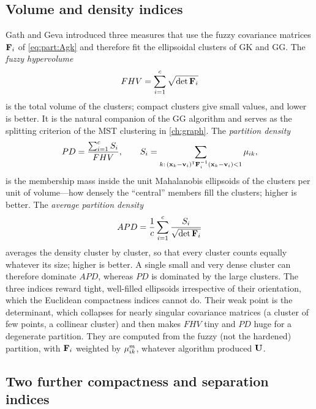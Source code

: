 \subsection{Volume and density indices}\label{sec:val:volume}

Gath and Geva \cite{gath:1989} introduced three measures that use the fuzzy covariance matrices $\mathbf{F}_i$ of \eqref{eq:part:Agk} and therefore fit the ellipsoidal clusters of GK and GG. The \emph{fuzzy hypervolume}
\begin{equation}
  FHV=\sum_{i=1}^{c}\sqrt{\det\mathbf{F}_i}
  \label{eq:val:fhv}
\end{equation}
is the total volume of the clusters; compact clusters give small values, and lower is better. It is the natural companion of the GG algorithm and serves as the splitting criterion of the MST clustering in \cref{ch:graph}. The \emph{partition density}
\begin{equation}
  PD=\frac{\sum_{i=1}^{c}S_i}{FHV},\qquad S_i=\sum_{k:\,(\mathbf{x}_k-\mathbf{v}_i)^{\mathsf{T}}\mathbf{F}_i^{-1}(\mathbf{x}_k-\mathbf{v}_i)<1}\mu_{ik},
  \label{eq:val:pd}
\end{equation}
is the membership mass inside the unit Mahalanobis ellipsoids of the clusters per unit of volume---how densely the ``central'' members fill the clusters; higher is better. The \emph{average partition density}
\begin{equation}
  APD=\frac1c\sum_{i=1}^{c}\frac{S_i}{\sqrt{\det\mathbf{F}_i}}
  \label{eq:val:apd}
\end{equation}
averages the density cluster by cluster, so that every cluster counts equally whatever its size; higher is better. A single small and very dense cluster can therefore dominate $APD$, whereas $PD$ is dominated by the large clusters. The three indices reward tight, well-filled ellipsoids irrespective of their orientation, which the Euclidean compactness indices cannot do. Their weak point is the determinant, which collapses for nearly singular covariance matrices (a cluster of few points, a collinear cluster) and then makes $FHV$ tiny and $PD$ huge for a degenerate partition. They are computed from the fuzzy (not the hardened) partition, with $\mathbf{F}_i$ weighted by $\mu_{ik}^m$, whatever algorithm produced $\mathbf{U}$.

\subsection{Two further compactness and separation indices}\label{sec:val:kwon}

